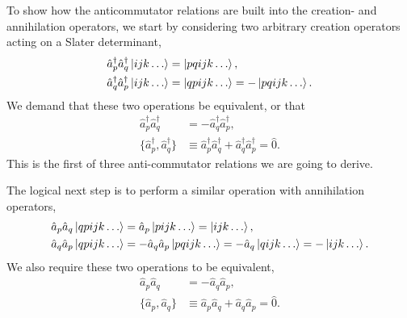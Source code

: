     To show how the anticommutator relations are built into the creation- and annihilation 
    operators, we start by considering two arbitrary creation operators acting on a Slater determinant,
    \begin{equation}
        \begin{aligned}
            \hat{a}_p^\dagger \hat{a}_q^\dagger \ket{ijk \dots} &= \ket{pqijk \dots}, \\
            \hat{a}_q^\dagger \hat{a}_p^\dagger \ket{ijk \dots} &= \ket{qpijk \dots}
                = - \ket{pqijk \dots}.
        \end{aligned}
    \end{equation}
    We demand that these two operations be equivalent, or that 
    \begin{equation}
        \begin{aligned}
            \hat{a}_p^\dagger \hat{a}_q^\dagger &= 
                -\hat{a}_q^\dagger \hat{a}_p^\dagger, \\
            \{\hat{a}_p^\dagger, \hat{a}_q^\dagger\} &\equiv 
                \hat{a}_p^\dagger \hat{a}_q^\dagger + 
                \hat{a}_q^\dagger \hat{a}_p^\dagger = \hat{0}.
        \end{aligned}
    \end{equation}
    This is the first of three anti-commutator relations we are going to derive.

    The logical next step is to perform a similar operation with annihilation 
    operators,
    \begin{equation}
        \begin{aligned}
            \hat{a}_p \hat{a}_q \ket{qpijk \dots} &= 
                \hat{a}_p\ket{pijk \dots} = \ket{ijk \dots}, \\
            \hat{a}_q \hat{a}_p \ket{qpijk \dots} &= 
                - \hat{a}_q \hat{a}_p \ket{pqijk \dots} = 
                - \hat{a}_q \ket{qijk \dots} = - \ket{ijk \dots}.
        \end{aligned}
    \end{equation}
    We also require these two operations to be equivalent, 
    \begin{equation}
        \begin{aligned}
            \hat{a}_p \hat{a}_q &= 
                -\hat{a}_q \hat{a}_p, \\
            \{\hat{a}_p, \hat{a}_q\} &\equiv 
                \hat{a}_p \hat{a}_q + 
                \hat{a}_q \hat{a}_p = \hat{0}.
        \end{aligned}
    \end{equation}

